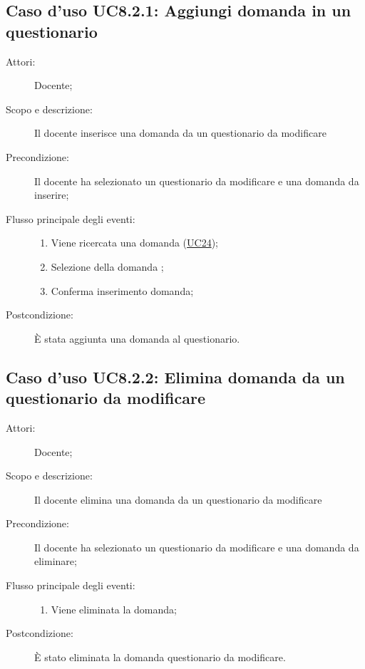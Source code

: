 \subsection{Caso d'uso UC8.2.1: Aggiungi domanda in un questionario}\begin{description}
\item[Attori:] Docente;
\item[Scopo e descrizione:] Il docente inserisce una domanda da un questionario da modificare
      \item[Precondizione:] Il docente ha selezionato un questionario da modificare e una domanda da inserire;

        \item[Flusso principale degli eventi:] \begin{enumerate}
          \item Viene ricercata una domanda (\hyperlink{UC24}{UC24});
          \item Selezione della domanda	;
          \item Conferma inserimento domanda;

      \end{enumerate}
    \item[Postcondizione:] È stata aggiunta una domanda al questionario.
  \end{description}
\hypertarget{UC8.2.2}{}
\subsection{Caso d'uso UC8.2.2: Elimina domanda da un questionario da  modificare}\begin{description}
\item[Attori:] Docente;
\item[Scopo e descrizione:] Il docente elimina una domanda da un questionario da modificare
      \item[Precondizione:] Il docente ha selezionato un questionario da modificare e una domanda da eliminare;

        \item[Flusso principale degli eventi:] \begin{enumerate}
          \item Viene eliminata la domanda;

      \end{enumerate}
    \item[Postcondizione:] È stato eliminata la domanda questionario da modificare.
  \end{description}
\hypertarget{UC8.2.3}{}
